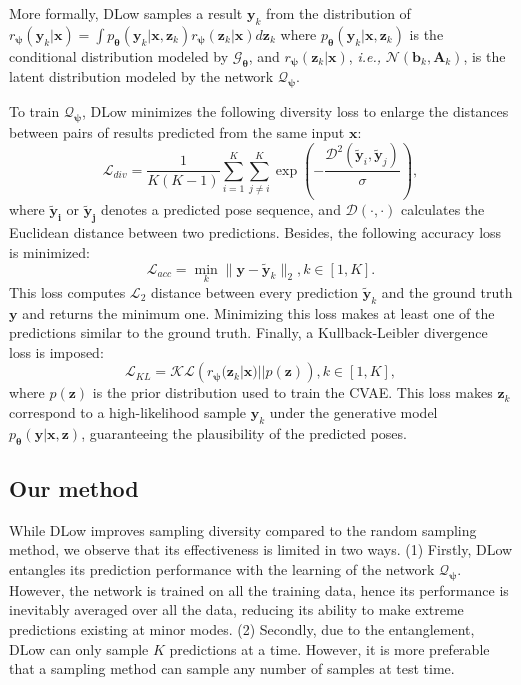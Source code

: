 \documentclass[sigconf,screen,nonacm]{acmart}
\begin{document}
	More formally, DLow samples a result $\mathbf{y}_k$ from the distribution of $r_{\bm{\psi}}(\mathbf{y}_k|\mathbf{x})=\int p_{\bm{\theta}}(\mathbf{y}_k|\mathbf{x},\mathbf{z}_k)r_{\bm{\psi}}(\mathbf{z}_k|\mathbf{x})d\mathbf{z}_k$ where $p_{\bm{\theta}}(\mathbf{y}_k|\mathbf{x},\mathbf{z}_k)$ is the conditional distribution modeled by $\mathcal{G}_{\bm{\theta}}$, and $r_{\bm{\psi}}(\mathbf{z}_k|\mathbf{x})$, \textit{i.e.,} $\mathcal{N}(\mathbf{b}_k,\mathbf{A}_k)$, is the latent distribution modeled by the network $\mathcal{Q}_{\bm{\psi}}$. 
	
	To train $\mathcal{Q}_{\bm{\psi}}$, DLow minimizes the following diversity loss to enlarge the distances between pairs of results predicted from the same input $\mathbf{x}$:
	\begin{equation}
		\label{eq:dlow-diversity-loss}
		\mathcal{L}_{div} = \frac{1}{K(K-1)}\sum_{i=1}^K\sum_{j\neq i}^K \exp \left( - \frac{\mathcal{D}^2(\mathbf{\tilde{y}}_i,\mathbf{\tilde{y}}_j)}{\sigma} \right),
	\end{equation}
	where $\mathbf{\tilde{y}_i}$ or $\mathbf{\tilde{y}_j}$ denotes a predicted pose sequence, and $\mathcal{D}(\cdot,\cdot)$ calculates the Euclidean distance between two predictions. Besides, the following accuracy loss is minimized:
	\begin{equation}
		\label{eq:dlow-ade-loss}
		\mathcal{L}_{acc} = \min_k \|\mathbf{y} - \mathbf{\tilde{y}}_k\|_2, k\in[1,K].
	\end{equation}
	This loss computes $\mathcal{L}_2$ distance between every prediction $\mathbf{\tilde{y}}_k$ and the ground truth $\mathbf{y}$ and returns the minimum one. Minimizing this loss makes at least one of the predictions similar to the ground truth. Finally, a Kullback-Leibler divergence loss is imposed:
	\begin{equation}
		\label{eq:kl-loss}
		\mathcal{L}_{KL} = \mathcal{KL}\left(r_{\bm{\psi}}(\mathbf{z}_k|\mathbf{x})||p(\mathbf{z})\right), k\in[1,K],
	\end{equation}
where $p(\mathbf{z})$ is the prior distribution used to train the CVAE. This loss makes $\mathbf{z}_k$ correspond to a high-likelihood sample $\mathbf{y}_k$ under the generative model $p_{\bm{\theta}}(\mathbf{y}|\mathbf{x},\mathbf{z})$, guaranteeing the plausibility of the predicted poses.
	
	\subsection{Our method}
	\label{sec:our-method}
	While DLow improves sampling diversity compared to the random sampling method, we observe that its effectiveness is limited in two ways. (1) Firstly, DLow entangles its prediction performance with the learning of the network $\mathcal{Q}_{\bm{\psi}}$. However, the network is trained on all the training data, hence its performance is inevitably averaged over all the data, reducing its ability to make extreme predictions existing at minor modes. (2) Secondly, due to the entanglement, DLow can only sample $K$ predictions at a time. However, it is more preferable that a sampling method can sample any number of samples at test time. 
\end{document}
